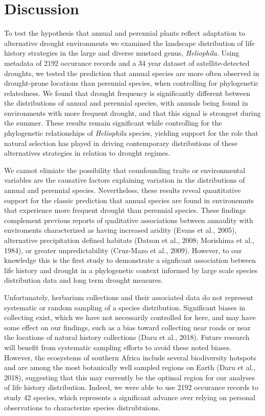 \documentclass[man,floatsintext]{apa6}
\theoremstyle{definition}
\theoremstyle{definition}
\theoremstyle{definition}
\theoremstyle{remark}
\begin{document}
\hypertarget{discussion}{%
\section{Discussion}\label{discussion}}

To test the hypothesis that annual and perennial plants reflect
adaptation to alternative drought environments we examined the landscape
distribution of life history strategies in the large and diverse mustard
genus, \emph{Heliophila}. Using metadata of 2192 occurance records and a
34 year dataset of satellite-detected droughts, we tested the prediction
that annual species are more often observed in drought-prone locations
than perennial species, when controlling for phylogenetic relatedness.
We found that drought frequency is significantly different between the
distributions of annual and perennial species, with annuals being found
in environments with more frequent drought, and that this signal is
strongest during the summer. These results remain significant while
controlling for the phylogenetic relationships of \emph{Heliophila}
species, yielding support for the role that natural selection has played
in driving contemporary distributions of these alternatives strategies
in relation to drought regimes.

We cannot elimiate the possibility that counfounding traits or
environmental variables are the causative factors explaining variation
in the distributions of annual and perennial species. Nevertheless,
these results reveal quantitative support for the classic prediction
that annual species are found in environemnts that experience more
frequent drought than perennial species. These findings complement
previous reports of qualitative associations between annaulity with
enviroments characterized as having increased aridity (Evans et al.,
2005), alternative precipitation defined habitats (Datson et al., 2008;
Morishima et al., 1984), or greater unpredictability (Cruz-Mazo et al.,
2009). However, to our knowledge this is the first study to demonstrate
a signficant association between life history and drought in a
phylogenetic context informed by large scale species distribution data
and long term drought measures.

Unfortunately, herbarium collections and their associated data do not
represent systematic or random sampling of a species distribution.
Significant biases in collecting exist, which we have not necessarily
controlled for here, and may have some effect on our findings, such as a
bias toward collecting near roads or near the locations of natural
history collections (Daru et al., 2018). Future research will benefit
from systematic sampling efforts to avoid these noted biases. However,
the ecosystems of southern Africa include several biodiversity hotspots
and are among the most botanically well sampled regions on Earth (Daru
et al., 2018), suggesting that this may currently be the optimal region
for our analyses of life history distribution. Indeed, we were able to
use 2192 occurance records to study 42 species, which represents a
significant advance over relying on personal observations to
characterize species distrubtuions.
\end{document}
